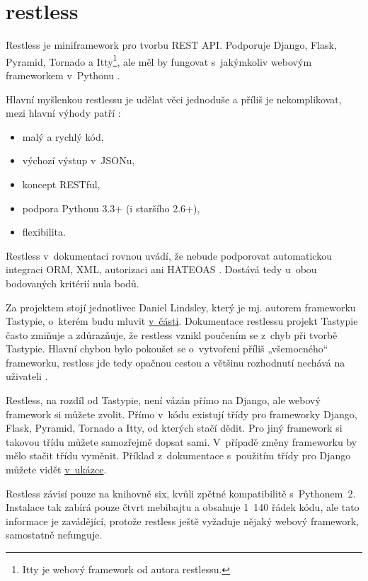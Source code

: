 \section{restless}\label{restless}

Restless je miniframework pro tvorbu REST API. Podporuje Django, Flask, Pyramid, Tornado a Itty\footnote{Itty je webový framework od autora restlessu.}, ale měl by fungovat s~jakýmkoliv webovým frameworkem v~Pythonu \autocite{restless}.

Hlavní myšlenkou restlessu je udělat věci jednoduše a příliš je nekomplikovat, mezi hlavní výhody patří \autocite{restless}:

\begin{itemize}
\tightlist
\item
  malý a rychlý kód,
\item
  výchozí výstup v~JSONu,
\item
  koncept RESTful,
\item
  podpora Pythonu 3.3+ (i staršího 2.6+),
\item
  flexibilita.
\end{itemize}

Restless v~dokumentaci rovnou uvádí, že nebude podporovat automatickou integraci ORM, XML, autorizaci ani HATEOAS \autocite{restless}\autocite{restlessp}. Dostává tedy u~obou bodovaných kritérií nula bodů.

Za projektem stojí jednotlivec Daniel Lindsley, který je mj. autorem frameworku Tastypie, o~kterém budu mluvit \protect\hyperlink{tastypie}{v~části}. Dokumentace restlessu projekt Tastypie často zmiňuje a zdůrazňuje, že restless vznikl poučením se z~chyb při tvorbě Tastypie. Hlavní chybou bylo pokoušet se o~vytvoření příliš „všemocného“ frameworku, restless jde tedy opačnou cestou a většinu rozhodnutí nechává na uživateli \autocite{restlessp}.

Restless, na rozdíl od Tastypie, není vázán přímo na Django, ale webový framework si můžete zvolit. Přímo v~kódu existují třídy pro frameworky Django, Flask, Pyramid, Tornado a Itty, od kterých stačí dědit. Pro jiný framework si takovou třídu můžete samozřejmě dopsat sami. V~případě změny frameworku by mělo stačit třídu vyměnit. Příklad z~dokumentace s~použitím třídy pro Django můžete vidět \protect\hyperlink{code:restless}{v~ukázce}.

Restless závisí pouze na knihovně six, kvůli zpětné kompatibilitě s~Pythonem~2. Instalace tak zabírá pouze čtvrt mebibajtu a obsahuje 1~140 řádek kódu, ale tato informace je zavádějící, protože restless ještě vyžaduje nějaký webový framework, samostatně nefunguje.

